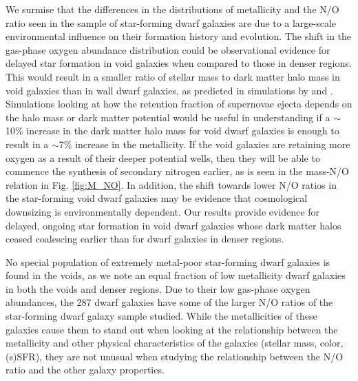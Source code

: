 We surmise that the differences in the distributions of metallicity and the N/O 
ratio seen in the sample of star-forming dwarf galaxies are due to a large-scale 
environmental influence on their formation history and evolution.  The shift in 
the gas-phase oxygen abundance distribution could be observational evidence for 
delayed star formation in void galaxies when compared to those in denser 
regions.  This would result in a smaller ratio of stellar mass to dark matter 
halo mass in void galaxies than in wall dwarf galaxies, as predicted in 
simulations by \cite{Jung14} and \cite{Tonnesen15}.  Simulations looking at how 
the retention fraction of supernovae ejecta depends on the halo mass or dark 
matter potential would be useful in understanding if a $\sim$10\% increase in 
the dark matter halo mass for void dwarf galaxies is enough to result in a 
$\sim$7\% increase in the metallicity.  If the void galaxies are retaining more 
oxygen as a result of their deeper potential wells, then they will be able to 
commence the synthesis of secondary nitrogen earlier, as is seen in the mass-N/O 
relation in Fig. \ref{fig:M_NO}.  In addition, the shift towards lower N/O 
ratios in the star-forming void dwarf galaxies may be evidence that cosmological 
downsizing is environmentally dependent.  Our results provide evidence for 
delayed, ongoing star formation in void dwarf galaxies whose dark matter halos 
ceased coalescing earlier than for dwarf galaxies in denser regions.

No special population of extremely metal-poor star-forming dwarf galaxies is 
found in the voids, as we note an equal fraction of low metallicity dwarf 
galaxies in both the voids and denser regions.  Due to their low gas-phase 
oxygen abundances, the 287 dwarf galaxies have some of the larger N/O ratios of 
the star-forming dwarf galaxy sample studied.  While the metallicities of these 
galaxies cause them to stand out when looking at the relationship between the 
metallicity and other physical characteristics of the galaxies (stellar mass, 
color, (s)SFR), they are not unusual when studying the relationship between the 
N/O ratio and the other galaxy properties.